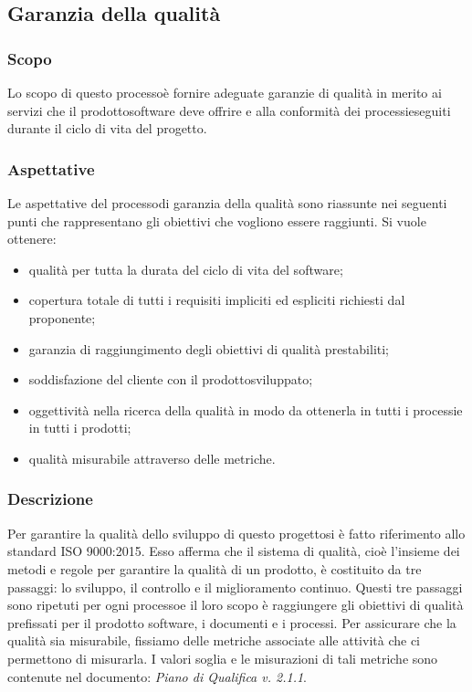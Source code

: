 \subsection{Garanzia della qualità}
\subsubsection{Scopo}
Lo scopo di questo processo\glosp è fornire adeguate garanzie di qualità in merito ai servizi che il prodotto\glosp software deve offrire e alla conformità dei processi\glosp eseguiti durante il ciclo di vita del progetto\glo.
\subsubsection{Aspettative}
Le aspettative del processo\glo di garanzia della qualità sono riassunte nei seguenti punti che rappresentano gli obiettivi che vogliono essere raggiunti. Si vuole ottenere:
\begin{itemize}
	\item qualità per tutta la durata del ciclo di vita del software;
	\item copertura totale di tutti i requisiti impliciti ed espliciti richiesti dal proponente;
	\item garanzia di raggiungimento degli obiettivi di qualità prestabiliti;
	\item soddisfazione del cliente con il prodotto\glosp sviluppato;
	\item oggettività nella ricerca della qualità in modo da ottenerla in tutti i processi\glosp e in tutti i prodotti\glo;
	\item qualità misurabile attraverso delle metriche.
\end{itemize}
\subsubsection{Descrizione}
Per garantire la qualità dello sviluppo di questo progetto\glosp si è fatto riferimento allo standard ISO 9000:2015. Esso afferma che il sistema di qualità, cioè l'insieme dei metodi e regole per garantire la qualità di un prodotto\glo, è costituito da tre passaggi: lo sviluppo, il controllo e il miglioramento continuo. Questi tre passaggi sono ripetuti per ogni processo\glosp e il loro scopo è raggiungere gli obiettivi di qualità prefissati per il prodotto software, i documenti e i processi.
Per assicurare che la qualità sia misurabile, fissiamo delle metriche associate alle attività che ci permettono di misurarla. I valori soglia e le misurazioni di tali metriche sono contenute nel documento: \textit{Piano di Qualifica v. 2.1.1}.
